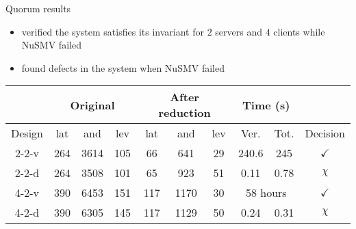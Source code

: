\begin{frame}{Quorum results}
\begin{itemize}
 \item \biptool{} verified the system satisfies its invariant
 for $2$ servers and $4$ clients while NuSMV failed
 \item \biptool{} found defects in the system when NuSMV failed
\end{itemize}
\begin{table}
\centering
\small{
\begin{tabular}{|c|c|c|c|c|c|c|c|c|c|}
\cline{2-9}
\multicolumn{1}{c|}{} & \multicolumn{ 3}{c|}{Original} & \multicolumn{ 3}{c|}{After reduction} & \multicolumn{ 2}{c|}{Time (s)} & \multicolumn{1}{l}{} \\ \hline
Design & lat & and & lev & lat & and & lev & Ver. & Tot. & Decision \\ \hline
2-2-v & 264 & 3614 & 105 & 66 & 641 & 29 & 240.6 & 245 & $\checkmark$\\ \hline
2-2-d & 264 & 3508 & 101 & 65 & 923 & 51 & 0.11 & 0.78 & $\chi$\\ \hline
4-2-v & 390 & 6453 & 151 & 117 & 1170 & 30 & \multicolumn{2}{c|}{58 hours}& $\checkmark$\\ \hline
4-2-d & 390 & 6305 & 145 & 117 & 1129 & 50 & 0.24 & 0.31 & $\chi$ \\ \hline
\end{tabular}}
\end{table}
\end{frame}
